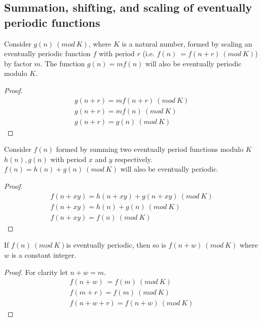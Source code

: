 \documentclass[12pt,reqno]{article}
\begin{document}
\subsection{Summation, shifting, and scaling of eventually periodic functions}
\begin{proposition}

Consider $g(n)~{} (mod ~{} K)$, where $K$ is a natural number, formed by scaling an eventually periodic function $f$ with period $r$  (i.e. $f(n)~{}  = f(n + r)~{} (mod ~{} K)$) by factor $m$. The function $g(n) = mf(n)$ will also be eventually periodic modulo $K$. 
\begin{proof}

\begin{align}
	g(n +r) =m f(n + r)~{} (mod ~{} K)\\
	g(n +r) = m f(n)~{} (mod ~{} K) \\
	g(n +r)	= g(n) ~{} (mod ~{} K)
\end{align}

\end{proof}
	
\end{proposition}
\begin{proposition}

Consider $f(n)$ formed by summing two eventually period functions modulo $K$ $h(n), g(n)$ with period $x$ and $y$ respectively. $f(n) = h(n) + g(n) ~{}(mod ~{} K)$ will also be eventually periodic.
\begin{proof}
\begin{align}
	f(n + xy) = h(n + xy) + g(n + xy)~{} (mod ~{} K)\\
	f(n + xy) = h(n) + g(n) ~{} (mod ~{} K)\\
	f(n +xy)= f(n)~{} (mod ~{} K)
\end{align}
\end{proof}



\end{proposition}
\begin{proposition}
	If $f(n) ~{} (mod ~{} K) $is eventually periodic, then so is $f(n + w) ~{} (mod ~{} K)$ where $w$ is a constant integer. 
	
	\begin{proof}
	For clarity let $n + w = m$.
		\begin{align}
			f(n + w) ~{}  = f(m) ~{}(mod ~{} K)\\
			f(m + r) = f(m) ~{}(mod ~{} K)\\
			f(n + w + r) = f(n + w) ~{}(mod ~{} K)
		\end{align}
		
	\end{proof}
\end{proposition}
\end{document}
